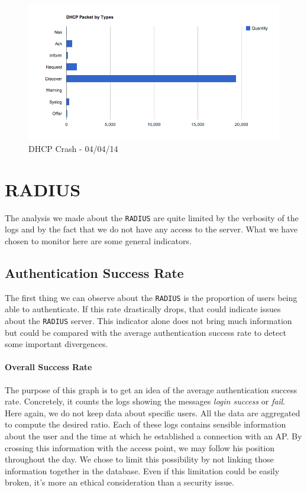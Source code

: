 \begin{figure}[H]
	\centering
   \includegraphics[width=1\textwidth]{Pictures/chapter5/dhcpCrash.png}
   \caption{DHCP Crash - 04/04/14}
\end{figure}

\section{RADIUS}
The analysis we made about the \texttt{RADIUS} are quite limited by the verbosity of the logs and by the fact that we do not have any access to the server. What we have chosen to monitor here are some general indicators.

\subsection{Authentication Success Rate}
The first thing we can observe about the \texttt{RADIUS} is the proportion of users being able to authenticate. If this rate drastically drops, that could indicate issues about the \texttt{RADIUS} server. This indicator alone does not bring much information but could be compared with the average authentication success rate to detect some important divergences.

\paragraph*{Overall Success Rate} The purpose of this graph is to get an idea of the average authentication success rate. Concretely, it counts the logs showing the messages \textit{login success} or \textit{fail}. Here again, we do not keep data about specific users. All the data are aggregated to compute the desired ratio. Each of these logs contains sensible information about the user and the time at which he established a connection with an AP. By crossing this information with the access point, we may follow his position throughout the day. We chose to limit this possibility by not linking those information together in the database. Even if this limitation could be easily broken, it's more an ethical consideration than a security issue.

